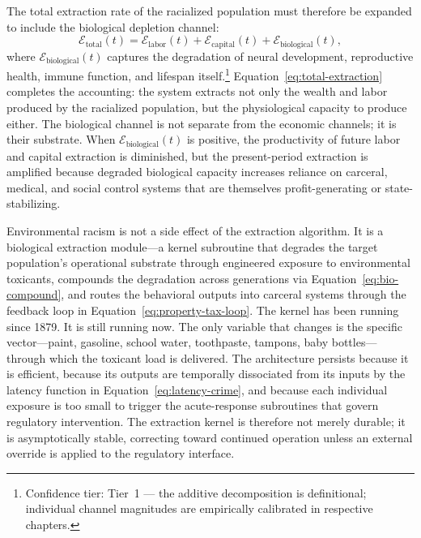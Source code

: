 The total extraction rate of the racialized population must therefore be expanded
to include the biological depletion channel:
\begin{equation}
\mathcal{E}_{\text{total}}(t) = \mathcal{E}_{\text{labor}}(t) + \mathcal{E}_{\text{capital}}(t) + \mathcal{E}_{\text{biological}}(t),
\label{eq:total-extraction}
\end{equation}
where $\mathcal{E}_{\text{biological}}(t)$ captures the degradation of neural
development, reproductive health, immune function, and lifespan itself.\footnote{Confidence tier: Tier~1 --- the additive decomposition is definitional;
individual channel magnitudes are empirically calibrated in respective chapters.}
Equation~\eqref{eq:total-extraction} completes the accounting: the system
extracts not only the wealth and labor produced by the racialized population, but
the physiological capacity to produce either. The biological channel is not
separate from the economic channels; it is their substrate. When
$\mathcal{E}_{\text{biological}}(t)$ is positive, the productivity of future
labor and capital extraction is diminished, but the present-period extraction is
amplified because degraded biological capacity increases reliance on carceral,
medical, and social control systems that are themselves profit-generating or
state-stabilizing.

Environmental racism is not a side effect of the extraction algorithm. It is
a biological extraction module---a kernel subroutine that degrades the target
population's operational substrate through engineered exposure to environmental
toxicants, compounds the degradation across generations via
Equation~\eqref{eq:bio-compound}, and routes the behavioral outputs into
carceral systems through the feedback loop in
Equation~\eqref{eq:property-tax-loop}. The kernel has been running since 1879.
It is still running now. The only variable that changes is the specific
vector---paint, gasoline, school water, toothpaste, tampons, baby bottles---through
which the toxicant load is delivered. The architecture persists because it is
efficient, because its outputs are temporally dissociated from its inputs by the
latency function in Equation~\eqref{eq:latency-crime}, and because each
individual exposure is too small to trigger the acute-response subroutines that
govern regulatory intervention. The extraction kernel is therefore not merely
durable; it is asymptotically stable, correcting toward continued operation
unless an external override is applied to the regulatory interface.
